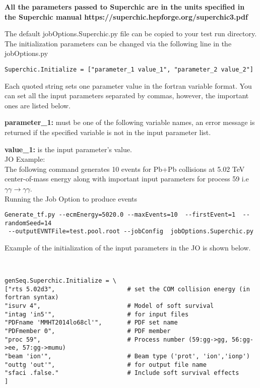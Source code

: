 \documentclass[11pt]{article}
\begin{document}
{\bf All the parameters passed to Superchic are in the units specified
in the Superchic manual https://superchic.hepforge.org/superchic3.pdf }

The default jobOptions.Superchic.py file  can be copied to your test run directory. The initialization parameters can be changed via the following line in the jobOptions.py

\begin{verbatim}Superchic.Initialize = ["parameter_1 value_1", "parameter_2 value_2"]
\end{verbatim}

Each quoted string sets one parameter value in the fortran variable format. You can set all the input parameters
separated by commas, however, the important ones are listed below.



{\bf parameter\_1:} must be one of the following variable names, an error message is returned if the specified variable is not in the input parameter list. 

{\bf value\_1:} is the input parameter's value.\\

JO Example:\\
The following command generates 10 events for Pb+Pb collisions at 5.02 TeV center-of-mass energy along with important input parameters for process 59 i.e $\gamma \gamma  \rightarrow \gamma \gamma$. \\

Running the  Job Option to produce events 
\begin{verbatim}
Generate_tf.py --ecmEnergy=5020.0 --maxEvents=10  --firstEvent=1  --randomSeed=14 
 --outputEVNTFile=test.pool.root --jobConfig  jobOptions.Superchic.py

\end{verbatim}


Example of the initialization of the input parameters in the JO is shown below.


\begin{verbatim}


genSeq.Superchic.Initialize = \
["rts 5.02d3",                    # set the COM collision energy (in fortran syntax)
"isurv 4",                        # Model of soft survival
"intag 'in5'",                    # for input files
"PDFname 'MMHT2014lo68cl'",       # PDF set name
"PDFmember 0",                    # PDF member
"proc 59",                        # Process number (59:gg->gg, 56:gg->ee, 57:gg->mumu)
"beam 'ion'",                     # Beam type ('prot', 'ion','ionp')
"outtg 'out'",                    # for output file name
"sfaci .false."                   # Include soft survival effects
]

\end{verbatim}
\end{document}
